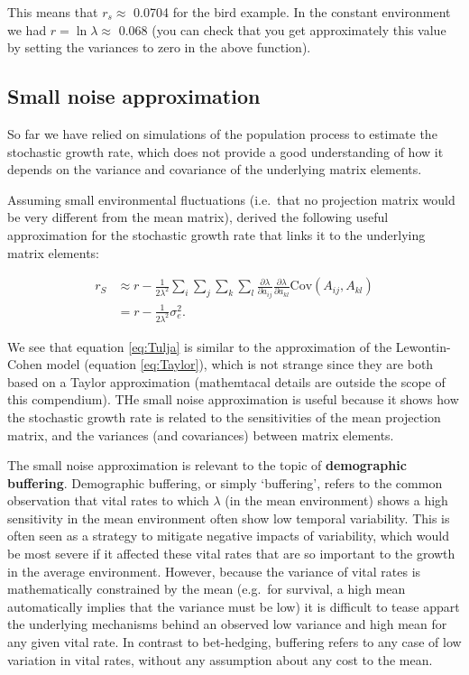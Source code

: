 \documentclass[
]{book}
\begin{document}
This means that \(r_s\approx\) 0.0704 for the bird example. In the constant environment we had \(r= \ln\lambda\approx\) 0.068 (you can check that you get approximately this value by setting the variances to zero in the above function).

\hypertarget{small-noise-approximation}{%
\subsection{Small noise approximation}\label{small-noise-approximation}}

So far we have relied on simulations of the population process to estimate the stochastic growth rate, which does not provide a good understanding of how it depends on the variance and covariance of the underlying matrix elements.

Assuming small environmental fluctuations (i.e.~that no projection matrix would be very different from the mean matrix), \citet{Tuljapurkar7} derived the following useful approximation for the stochastic growth rate that links it to the underlying matrix elements:

\begin{align} 
r_S&\approx r-\frac{1}{2\lambda^2}\sum_{i}\sum_{j}\sum_{k}\sum_{l}\frac{\partial\lambda}{\partial a_{ij}}\frac{\partial\lambda}{\partial a_{kl}}\text{Cov}(A_{ij},A_{kl})\\
&= r-\frac{1}{2\lambda^2}\sigma_e^2.
\label{eq:Tulja}
\end{align}

We see that equation \eqref{eq:Tulja} is similar to the approximation of the Lewontin-Cohen model (equation \eqref{eq:Taylor}), which is not strange since they are both based on a Taylor approximation (mathemtacal details are outside the scope of this compendium). THe small noise approximation is useful because it shows how the stochastic growth rate is related to the sensitivities of the mean projection matrix, and the variances (and covariances) between matrix elements.

The small noise approximation is relevant to the topic of \textbf{demographic buffering}. Demographic buffering, or simply `buffering', refers to the common observation that vital rates to which \(\lambda\) (in the mean environment) shows a high sensitivity in the mean environment often show low temporal variability. This is often seen as a strategy to mitigate negative impacts of variability, which would be most severe if it affected these vital rates that are so important to the growth in the average environment. However, because the variance of vital rates is mathematically constrained by the mean (e.g.~for survival, a high mean automatically implies that the variance must be low) it is difficult to tease appart the underlying mechanisms behind an observed low variance and high mean for any given vital rate. In contrast to bet-hedging, buffering refers to any case of low variation in vital rates, without any assumption about any cost to the mean.
\end{document}
